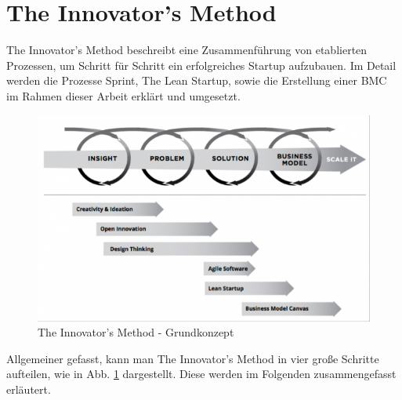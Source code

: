\section{The Innovator's Method}

The Innovator's Method beschreibt eine Zusammenführung von etablierten Prozessen, um Schritt für Schritt ein erfolgreiches Startup aufzubauen.
Im Detail werden die Prozesse Sprint, The Lean Startup, sowie die Erstellung einer \ac{BMC} im Rahmen dieser Arbeit erklärt und umgesetzt.

\begin{figure}[h!]
	\begin{center}
		\includegraphics[width=\textwidth]{99_IMG/02_Grundlagen/innovatorsMethod.png}
		\caption{The Innovator's Method - Grundkonzept}
		\label{fig:TheInnovatorsMethod}
	\end{center}
\end{figure}

Allgemeiner gefasst, kann man The Innovator's Method in vier große Schritte aufteilen, wie in Abb. \ref{fig:TheInnovatorsMethod} dargestellt. Diese werden im Folgenden zusammengefasst erläutert.

